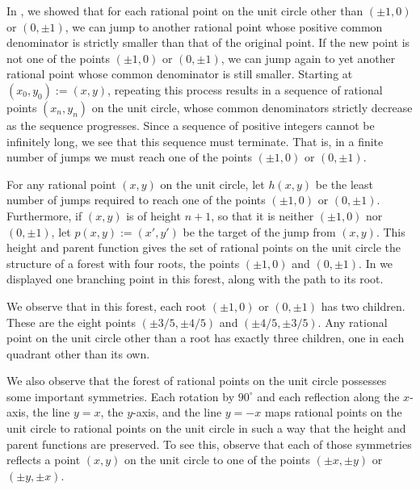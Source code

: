 \begin{example}
  In , we showed that for each rational point on the unit circle other than $(\pm 1,0)$ or $(0,\pm 1)$, we can jump to another rational point whose positive common denominator is strictly smaller than that of the original point. If the new point is not one of the points $(\pm 1,0)$ or $(0,\pm 1)$, we can jump again to yet another rational point whose common denominator is still smaller. Starting at $(x_0,y_0):=(x,y)$, repeating this process results in a sequence of rational points $(x_n,y_n)$ on the unit circle, whose common denominators strictly decrease as the sequence progresses. Since a sequence of positive integers cannot be infinitely long, we see that this sequence must terminate. That is, in a finite number of jumps we must reach one of the points $(\pm 1,0)$ or $(0,\pm 1)$.

  For any rational point $(x,y)$ on the unit circle, let $h(x,y)$ be the least number of jumps required to reach one of the points $(\pm 1,0)$ or $(0,\pm 1)$. Furthermore, if $(x,y)$ is of height $n+1$, so that it is neither $(\pm 1,0)$ nor $(0,\pm 1)$, let $p(x,y):=(x',y')$ be the target of the jump from $(x,y)$. This height and parent function gives the set of rational points on the unit circle the structure of a forest with four roots, the points $(\pm 1,0)$ and $(0,\pm 1)$. In  we displayed one branching point in this forest, along with the path to its root.

  We observe that in this forest, each root $(\pm 1,0)$ or $(0,\pm 1)$ has two children. These are the eight points $(\pm 3/5,\pm 4/5)$ and $(\pm 4/5,\pm 3/5)$. Any rational point on the unit circle other than a root has exactly three children, one in each quadrant other than its own.

  We also observe that the forest of rational points on the unit circle possesses some important symmetries. Each rotation by $90^\circ$ and each reflection along the $x$-axis, the line $y=x$, the $y$-axis, and the line $y=-x$ maps rational points on the unit circle to rational points on the unit circle in such a way that the height and parent functions are preserved. To see this, observe that each of those symmetries reflects a point $(x,y)$ on the unit circle to one of the points $(\pm x,\pm y)$ or $(\pm y,\pm x)$.
\end{example}

